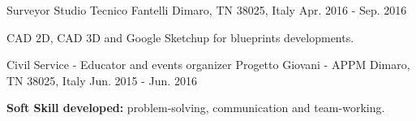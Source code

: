 \begin{cventries}
\cventry
{Surveyor} %
{Studio Tecnico Fantelli} %
{Dimaro, TN 38025, Italy} %
{Apr. 2016 - Sep. 2016} %
{
  \begin{cvitems} %
    \item {CAD 2D, CAD 3D and Google Sketchup for blueprints developments.}
  \end{cvitems}
}

\cventry
{Civil Service - Educator and events organizer} %
{Progetto Giovani - APPM} %
{Dimaro, TN 38025, Italy} %
{Jun. 2015 - Jun. 2016} %
{
  \begin{cvitems} %
    \item {\textbf{Soft Skill developed:} problem-solving, communication and team-working.}
  \end{cvitems}
}

\end{cventries}
